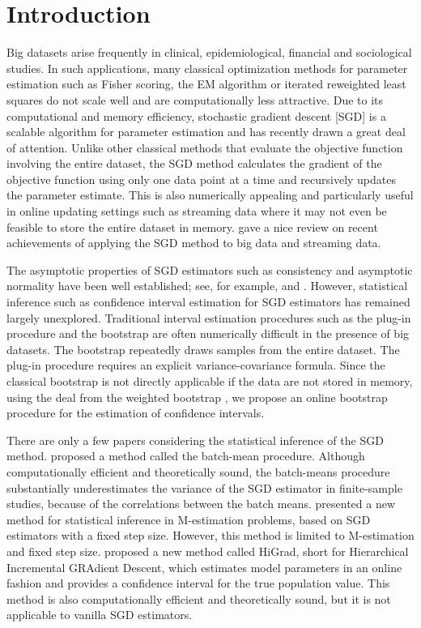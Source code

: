 \documentclass[twoside,11pt]{article}
\begin{document}
\section{Introduction}
Big datasets arise frequently in clinical, epidemiological, financial and sociological studies. In such applications, many classical optimization methods for parameter estimation such as Fisher scoring, the EM algorithm or iterated reweighted least squares \citep{Hastie09,Nelder72} do not scale well and are computationally less attractive. Due to its computational and memory efficiency, stochastic gradient descent \citep{Robbins51}[SGD] is a scalable algorithm for parameter estimation and has recently drawn a great deal of attention. Unlike other classical methods that evaluate the objective function involving the entire dataset, the SGD method calculates the gradient of the objective function using only one data point at a time and recursively updates the parameter estimate. This is also numerically appealing and particularly useful in online updating settings such as streaming data where it may not even be feasible to store the entire dataset in memory. \citet{Wang16} gave a nice review on recent achievements of applying the SGD method to big data and streaming data.

The asymptotic properties of SGD estimators such as consistency and asymptotic normality have been well established; see, for example, \cite{Ruppert88} and \cite{Polyak92}. However, statistical inference such as confidence interval estimation for SGD estimators has remained largely unexplored. Traditional interval estimation procedures such as the plug-in procedure and the bootstrap are often numerically difficult in the presence of big datasets. The bootstrap repeatedly draws samples from the entire dataset. The plug-in procedure requires an explicit variance-covariance formula.  Since the classical bootstrap is not directly applicable if the data are not stored in memory, using the deal from the weighted bootstrap \citep{Rubin81}, we propose an online bootstrap procedure for the estimation of confidence intervals.

There are only a few papers considering the statistical inference of the SGD method. \cite{Chen16} proposed a method called the batch-mean procedure. Although computationally efficient and theoretically sound, the batch-means procedure substantially underestimates the variance of the SGD estimator in finite-sample studies, because of the correlations between the batch means. \cite{Li17} presented a new method for statistical inference in M-estimation problems, based on SGD estimators with a fixed step size. However, this method is limited to M-estimation and fixed step size. \cite{Su18} proposed a new method called HiGrad, short for Hierarchical Incremental GRAdient Descent, which estimates model parameters in an online fashion and provides a confidence interval for the true population value. This method is also computationally efficient and theoretically sound, but it is not applicable to vanilla SGD estimators.
\end{document}
